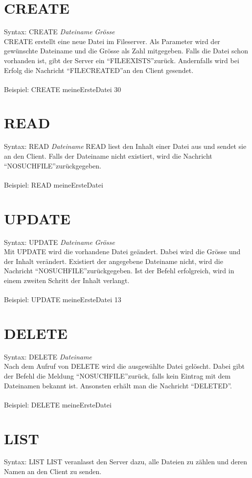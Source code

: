 \documentclass[12pt,a4paper,ngerman]{report}
\begin{document}
\section{CREATE}
Syntax: CREATE \textit{Dateiname} \textit{Grösse} \\
CREATE erstellt eine neue Datei im Fileserver. Als Parameter wird der gewünschte Dateiname und die Grösse als Zahl mitgegeben. Falls die Datei schon vorhanden ist, gibt der Server ein \textquotedblleft FILEEXISTS\textquotedblright zurück. Andernfalls wird bei Erfolg die Nachricht \textquotedblleft FILECREATED\textquotedblright an den Client gesendet.\\
\\
Beispiel: CREATE meineErsteDatei 30
\section{READ}
Syntax: READ \textit{Dateiname}
READ liest den Inhalt einer Datei aus und sendet sie an den Client. Falls der Dateiname nicht existiert, wird die Nachricht \textquotedblleft NOSUCHFILE\textquotedblright zurückgegeben.\\
\\
Beispiel: READ meineErsteDatei
\section{UPDATE}
Syntax: UPDATE \textit{Dateiname} \textit{Grösse}\\
Mit UPDATE wird die vorhandene Datei geändert. Dabei wird die Grösse und der Inhalt verändert. Existiert der angegebene Dateiname nicht, wird die Nachricht \textquotedblleft NOSUCHFILE\textquotedblright zurückgegeben. Ist der Befehl erfolgreich, wird in einem zweiten Schritt der Inhalt verlangt.\\
\\
Beispiel: UPDATE meineErsteDatei 13
\section{DELETE}
Syntax: DELETE \textit{Dateiname}\\
Nach dem Aufruf von DELETE wird die ausgewählte Datei gelöscht. Dabei gibt der Befehl die Meldung \textquotedblleft NOSUCHFILE\textquotedblright zurück, falls kein Eintrag mit dem Dateinamen bekannt ist. Ansonsten erhält man die Nachricht \textquotedblleft DELETED\textquotedblright . \\
\\
Beispiel: DELETE meineErsteDatei
\section{LIST}
Syntax: LIST
LIST veranlasst den Server dazu, alle Dateien zu zählen und deren Namen an den Client zu senden.
\end{document}
